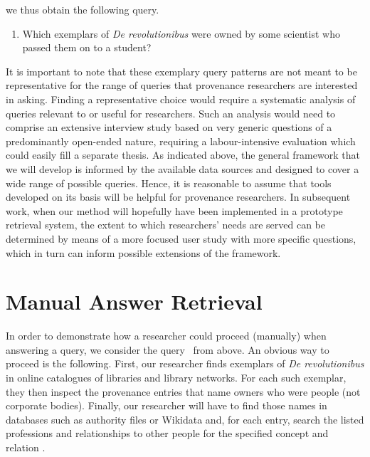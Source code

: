 we thus obtain the following query.
%
\newcommand{\Qtwoprime}{%
  \begin{enumerate}
    \item[\exaquery{2$'$}]
      Which exemplars of \emph{\foreignlanguage{latin}{De revolutionibus}} were owned by some scientist who passed them on to a student?
  \end{enumerate}
}%
\Qtwoprime
%
It is important to note that these exemplary query patterns are not meant to be representative
for the range of queries that provenance researchers are interested in asking.
Finding a representative choice would require a systematic analysis
of queries relevant to or useful for researchers.
Such an analysis would need to comprise an extensive interview study
based on very generic questions of a predominantly open-ended nature,
requiring a labour-intensive evaluation which could easily fill a separate thesis.
As indicated above, the general framework that we will develop
is informed by the available data sources
and designed to cover a wide range of possible queries.
Hence,
it is reasonable to assume that tools developed on its basis will be helpful for provenance researchers.
In subsequent work, when our method will hopefully have been implemented in a prototype retrieval system,
the extent to which researchers' needs are served can be determined by means of a more focused user study
with more specific questions, which in turn can inform possible extensions of the framework.

\section{Manual Answer Retrieval}
\label{sec:manual_answering}

In order to demonstrate how a researcher could proceed (manually) when answering a query,
we consider the query~ from above.
An obvious way to proceed is the following.
First, our researcher finds exemplars of \emph{\foreignlanguage{ngerman}{De revolutionibus}}
in online catalogues of libraries and library networks. For each such exemplar, they then inspect the provenance entries
that name owners who were people (not corporate bodies). Finally, our researcher will have to find those names in databases such as
authority files or Wikidata and, for each entry, search the listed professions 
and relationships to other people for the specified concept  and relation .

